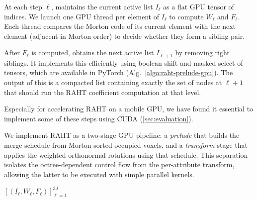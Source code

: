 %
At each step $\ell$, \gsnfs maintains the current active list $I_\ell$ as a flat GPU tensor of indices.
%
We launch one GPU thread per element of $I_\ell$ to compute $W_\ell$ and $F_\ell$.
%
Each thread compares the Morton code of its current element with the next element (adjacent in Morton order) to decide whether they form a sibling pair.

After $F_\ell$ is computed, \gsnfs{} obtains the next active list $I_{\ell+1}$  by removing right siblings.
%
It implements this efficiently using boolean shift and masked select of tensors, which are available in PyTorch (Alg.~\ref{algo:raht-prelude-gpu}).
%
The output of this is a compacted list containing exactly the set of nodes at $\ell+1$ that should run the RAHT coefficient computation at that level.

Especially for accelerating RAHT on a mobile GPU, we have found it essential to implement some of these steps using CUDA (\cref{sec:evaluation}).

%
We implement RAHT as a two-stage GPU pipeline: a \emph{prelude} that builds the merge schedule from Morton-sorted occupied voxels, and a \emph{transform} stage that applies the weighted orthonormal rotations using that schedule. This separation isolates the octree-dependent control flow from the per-attribute transform, allowing the latter to be executed with simple parallel kernels.

\begin{algorithm}[t!]
  \caption{RAHT prelude (non-parallel)}
  \label{algo:raht-prelude}
\SetAlgoLined
\DontPrintSemicolon
{}


\Return $[(I_\ell, W_\ell, F_\ell)]_{\ell=1}^{3J}$\;
\end{algorithm}

